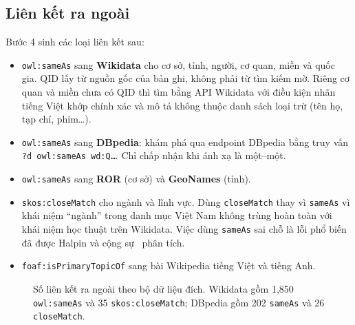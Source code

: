 \documentclass[12pt,a4paper]{article}
\begin{document}
\subsection{Liên kết ra ngoài}
Bước 4 sinh các loại liên kết sau:
\begin{itemize}
  \item \texttt{owl:sameAs} sang \textbf{Wikidata} cho cơ sở, tỉnh, người, cơ quan, miền và quốc gia. QID lấy từ nguồn
  gốc của bản ghi, không phải từ tìm kiếm mờ. Riêng cơ quan và miền chưa có QID thì tìm bằng API Wikidata với điều kiện
  nhãn tiếng Việt khớp chính xác và mô tả không thuộc danh sách loại trừ (tên họ, tạp chí, phim\dots).
  \item \texttt{owl:sameAs} sang \textbf{DBpedia}: khám phá qua endpoint DBpedia bằng truy vấn
  \texttt{?d owl:sameAs wd:Q…}. Chỉ chấp nhận khi ánh xạ là một--một.
  \item \texttt{owl:sameAs} sang \textbf{ROR} (cơ sở) và \textbf{GeoNames} (tỉnh).
  \item \texttt{skos:closeMatch} cho ngành và lĩnh vực. Dùng \texttt{closeMatch} thay vì \texttt{sameAs} vì khái niệm
  ``ngành'' trong danh mục Việt Nam không trùng hoàn toàn với khái niệm học thuật trên Wikidata. Việc dùng
  \texttt{sameAs} sai chỗ là lỗi phổ biến đã được Halpin và cộng sự~\cite{halpin2010sameas} phân tích.
  \item \texttt{foaf:isPrimaryTopicOf} sang bài Wikipedia tiếng Việt và tiếng Anh.
\end{itemize}

\begin{figure}[htbp]
\centering
{}
\caption{Số liên kết ra ngoài theo bộ dữ liệu đích. Wikidata gồm 1{,}850 \texttt{owl:sameAs} và 35
\texttt{skos:closeMatch}; DBpedia gồm 202 \texttt{sameAs} và 26 \texttt{closeMatch}.}\label{fig:links}
\end{figure}
\end{document}
